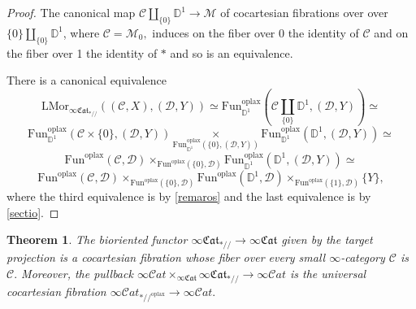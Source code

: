 \documentclass[10pt,oneside]{article}
\numberwithin{equation}{section} %
\numberwithin{figure}{section} %
\theoremstyle{plain}
\newtheorem{theorem}{Theorem}[subsection]
\theoremstyle{definition}
\newcommand{\bD}{{\mathbb D}}
\newcommand{\mC}{{\mathcal C}}
\newcommand{\mD}{{\mathcal D}}
\newcommand{\mM}{{\mathcal M}}
\renewcommand{\L}{{\mathrm L}}
\newcommand{\Fun}{\mathrm{Fun}}
\newcommand{\oplax}{{\mathrm{oplax}}}
\newcommand{\Mor}{{\mathrm{Mor}}}
\newcommand{\scat}{\mathcal{C}\mathit{at}}
\newcommand{\fcat}{\mathfrak{Cat}}
\begin{document}
\begin{proof}

The canonical map
$\mC \coprod_{\{0\}} \bD^1 \to \mM $  of cocartesian fibrations over over $\{0\} \coprod_{\{0\}} \bD^1$, where $\mC = \mM_0,$ induces on the fiber over 0 the identity of $\mC$ and on the fiber over 1 the identity of $*$ and so is an equivalence.

There is a canonical equivalence
$$
\L\Mor_{\infty\fcat_{*//}}((\mC,X), (\mD,Y)) \simeq \Fun^\oplax_{\bD^1}(\mC \coprod_{\{0\}} \bD^1, (\mD,Y))
\simeq $$$$
\Fun^\oplax_{\bD^1}(\mC \times \{0\}, (\mD,Y))
\underset{\Fun^\oplax_{\bD^1}(\{0\}, (\mD,Y))}{\times} \Fun^\oplax_{\bD^1}(\bD^1, (\mD,Y)) \simeq $$$$ \Fun^\oplax(\mC, \mD)
\times_{\Fun^\oplax(\{0\},\mD)} \Fun^\oplax_{\bD^1}(\bD^1, (\mD,Y)) \simeq $$$$ \Fun^\oplax(\mC,\mD) \times_{\Fun^\oplax(\{0\},\mD)} \Fun^\oplax(\bD^1,\mD) \times_{\Fun^\oplax(\{1\},\mD)} \{Y\},
$$
where the third equivalence is by \cref{remaros} and the last equivalence is by \cref{sectio}.
\end{proof}


\begin{theorem}
The bioriented functor $\infty\fcat_{*//} \to \infty\fcat$ given by the target projection is a cocartesian fibration whose fiber over every small $\infty$-category $\mC$ is $\mC.$
Moreover, the pullback $\infty\scat \times_{\infty\fcat} \infty\fcat_{*//} \to \infty\scat$
is the universal cocartesian fibration $ \infty\scat_{*//^\oplax} \to \infty\scat.$

\end{theorem}
\end{document}

